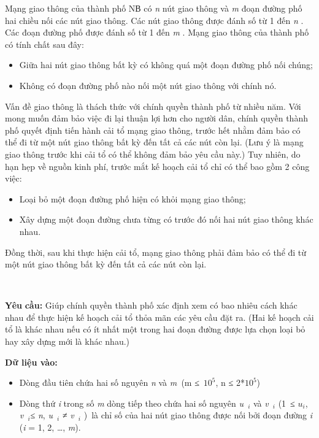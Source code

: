 

Mạng giao thông của thành phố NВ có \emph{ n } nút giao thông và \emph{ m } đoạn đường phố hai chiều nối các nút giao thông. Các nút giao thông được đánh số từ 1 đến \emph{ n } . Các đoạn đường phố được đánh số từ 1 đến \emph{ m } . Mạng giao thông của thành phố có tính chất sau đây:
\begin{itemize}
	\item Giữa hai nút giao thông bất kỳ có không quá một đoạn đường phố nối chúng;
	\item Không có đoạn đường phố nào nối một nút giao thông với chính nó.
\end{itemize}

Vấn đề giao thông là thách thức với chính quyền thành phố từ nhiều năm. Với mong muốn đảm bảo việc đi lại thuận lợi hơn cho người dân, chính quyền thành phố quyết định tiến hành cải tổ mạng giao thông, trước hết nhằm đảm bảo có thể đi từ một nút giao thông bất kỳ đến tất cả các nút còn lại. (Lưu ý là mạng giao thông trước khi cải tổ có thể không đảm bảo yêu cầu này.) Tuy nhiên, do hạn hẹp về nguồn kinh phí, trước mắt kế hoạch cải tổ chỉ có thể bao gồm 2 công việc:
\begin{itemize}
	\item Loại bỏ một đoạn đường phố hiện có khỏi mạng giao thông;
	\item Xây dựng một đoạn đường chưa từng có trước đó nối hai nút giao thông khác nhau.
\end{itemize}

Đồng thời, sau khi thực hiện cải tổ, mạng giao thông phải đảm bảo có thể đi từ một nút giao thông bất kỳ đến tất cả các nút còn lại.

 

\textbf{Yêu }\textbf{}\textbf{ cầu: }\textbf{} Giúp chính quyền thành phố xác định xem có bao nhiêu cách khác nhau để thực hiện kế hoạch cải tổ thỏa mãn các yêu cầu đặt ra. (Hai kế hoạch cải tổ là khác nhau nếu có ít nhất một trong hai đoạn đường được lựa chọn loại bỏ hay xây dựng mới là khác nhau.)

\textbf{Dữ liệu vào: }
\begin{itemize}
	\item Dòng đầu tiên chứa hai số nguyên \emph{ n } và \emph{ m }(m ≤ $10^{5}$, n ≤ 2*$10^{5}$)
	\item Dòng thứ \emph{ i } trong số \emph{ m } dòng tiếp theo chứa hai số nguyên \emph{ u }\emph{$_i $} và \emph{ v }\emph{$_i $}\emph{} (1 ≤ \emph{ $u_{i}$}, \emph{ v }\emph{$_i  $}≤ \emph{ n}, \emph{ u }\emph{$_i  $} ≠ \emph{ v }\emph{$_i $} ) là chỉ số của hai nút giao thông được nối bởi đoạn đường \emph{ i } (\emph{i }\emph{} = 1, 2, …, \emph{ m}).
\end{itemize}

